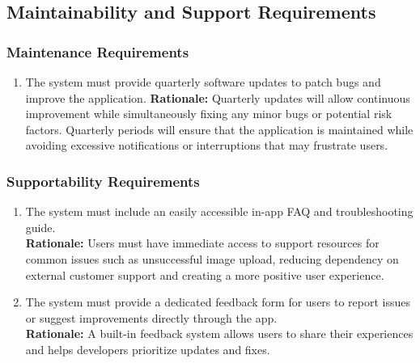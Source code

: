 \documentclass[]{article}
\begin{document}
\begin{enumerate}[{\bf BE1.}]

\subsection{Maintainability and Support Requirements}
\label{sub:maintainability_and_support_requirements}

\subsubsection{Maintenance Requirements}
\label{ssub:maintenance_requirements}
\begin{enumerate}[{MS-M}1. ]
	\item The system must provide quarterly software updates to patch bugs and improve the application. \textbf{Rationale:} Quarterly updates will allow continuous improvement while simultaneously fixing any minor bugs or potential risk factors. Quarterly periods will ensure that the application is maintained while avoiding excessive notifications or interruptions that may frustrate users.
\end{enumerate}

\subsubsection{Supportability Requirements}
\label{ssub:supportability_requirements}
\begin{enumerate}[{MS-S}1. ]
	\item The system must include an easily accessible in-app FAQ and troubleshooting guide. \\
    \textbf{Rationale: }Users must have immediate access to support resources for common issues such as unsuccessful image upload,   reducing dependency on external customer support and creating a more positive user experience.
	\item The system must provide a dedicated feedback form for users to report issues or suggest improvements directly through the app. \\
    \textbf{Rationale:} A built-in feedback system allows users to share their experiences and helps developers prioritize updates and fixes.
\end{enumerate}


\end{enumerate}
\end{document}
